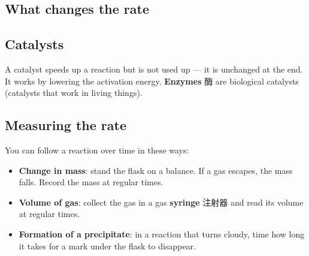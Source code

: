 \documentclass[11pt]{article}
\begin{document}
\subsection*{What changes the rate}

\begin{center}
\end{center}

\subsection*{Catalysts}

A catalyst speeds up a reaction but is not used up — it is unchanged at the end. It works by lowering the activation energy. \textbf{Enzymes} 酶 are biological catalysts (catalysts that work in living things).

\subsection*{Measuring the rate}

You can follow a reaction over time in these ways:

\begin{itemize}
\item \textbf{Change in mass}: stand the flask on a balance. If a gas escapes, the mass falls. Record the mass at regular times.

\item \textbf{Volume of gas}: collect the gas in a gas \textbf{syringe} 注射器 and read its volume at regular times.

\item \textbf{Formation of a precipitate}: in a reaction that turns cloudy, time how long it takes for a mark under the flask to disappear.

\end{itemize}
\end{document}
